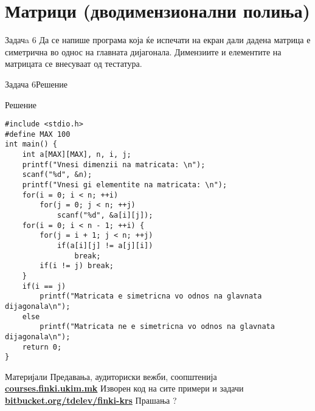 \section{Матрици (дводимензионални полиња)}

\begin{frame}{Задачa 6}
Да се напише програма која ќе испечати на екран дали дадена матрица е симетрична во однос на главната дијагонала. 
Димензиите и елементите на матрицата се внесуваат од тестатура.
\end{frame}

\begin{frame}[fragile]{Задача 6}{Решение} 
\begin{exampleblock}{Решение}
\begin{lstlisting}
#include <stdio.h>
#define MAX 100
int main() {
    int a[MAX][MAX], n, i, j;
    printf("Vnesi dimenzii na matricata: \n");
    scanf("%d", &n);
    printf("Vnesi gi elementite na matricata: \n");
    for(i = 0; i < n; ++i)
        for(j = 0; j < n; ++j)
            scanf("%d", &a[i][j]);
    for(i = 0; i < n - 1; ++i) {
        for(j = i + 1; j < n; ++j)
            if(a[i][j] != a[j][i])
                break;
        if(i != j) break;
    }
    if(i == j)
        printf("Matricata e simetricna vo odnos na glavnata dijagonala\n");
    else
        printf("Matricata ne e simetricna vo odnos na glavnata dijagonala\n");
    return 0;
}
\end{lstlisting}
\end{exampleblock}
\end{frame}

\begin{frame}{Материјали}{}
	Предавања, аудиториски вежби, соопштенија\\
	\href{http://courses.finki.ukim.mk/}{\textbf{courses.finki.ukim.mk}}
	\vfill
	Изворен код на сите примери и задачи\\
	\href{http://bitbucket.org/tdelev/finki-krs/}{\textbf{bitbucket.org/tdelev/finki-krs}}
	\vfill
	{\Huge Прашања ?}
\end{frame}


